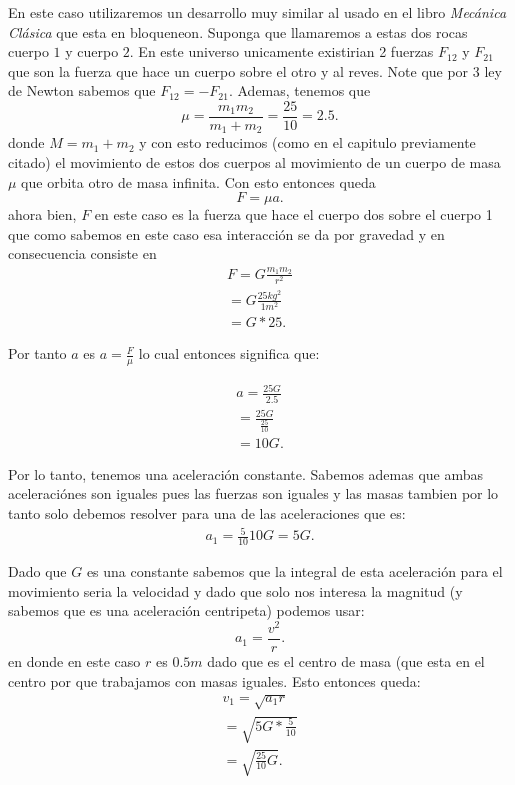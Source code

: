 \documentclass{report}
\begin{document}
En este caso utilizaremos un desarrollo muy similar al usado en el libro \textit{Mecánica Clásica} que esta en bloqueneon. Suponga que llamaremos a estas dos rocas cuerpo $1$ y cuerpo $2$. En este universo unicamente existirian 2 fuerzas  $F_{12}$ y $F_{21}$ que son la fuerza que hace un cuerpo sobre el otro y al reves. Note que por $3$ ley de Newton sabemos que $F_{12}=-F_{21}$. Ademas, tenemos que \[
\mu = \frac{m_1m_2}{m_1+m_2} = \frac{25}{10} = 2.5
.\] donde $M=m_1+m_2$ y con esto reducimos (como en el capitulo previamente citado) el movimiento de estos dos cuerpos al movimiento de un cuerpo de masa $\mu$ que orbita otro de masa infinita. Con esto entonces queda \[
F = \mu a
.\] ahora bien,  $F$ en este caso es la fuerza que hace el cuerpo dos sobre el cuerpo 1 que como sabemos en este caso esa interacción se da por gravedad y en consecuencia consiste en
\begin{align*}
  F = G \frac{m_1m_2}{r^2}\\
  = G \frac{25 kg^2}{1 m^2}\\
  = G*25
.\end{align*}

Por tanto $a$ es $a = \frac{F}{\mu}$ lo cual entonces significa que:

\begin{align*}
  a = \frac{25G}{2.5}\\
  = \frac{25G}{\frac{25}{10}}\\
  = 10G
.\end{align*}

Por lo tanto, tenemos una aceleración constante. Sabemos ademas que ambas aceleraciónes son iguales pues las fuerzas son iguales y las masas tambien por lo tanto solo debemos resolver para una de las aceleraciones que es:
\begin{align*}
  a_1 = \frac{5}{10}10G = 5G
.\end{align*}

Dado que $G$ es una constante sabemos que la integral de esta aceleración para el movimiento seria la velocidad y dado que solo nos interesa la magnitud (y sabemos que es una aceleración centripeta) podemos usar: \[
a_1 = \frac{v^2}{r}
.\] en donde en este caso $r$ es $0.5 m$ dado que es el centro de masa (que esta en el centro por que trabajamos con masas iguales. Esto entonces queda:
\begin{align*}
  v_1 = \sqrt{a_1r} \\
  = \sqrt{5G*\frac{5}{10}} \\
  = \sqrt{\frac{25}{10}G}
.\end{align*}
\end{document}
